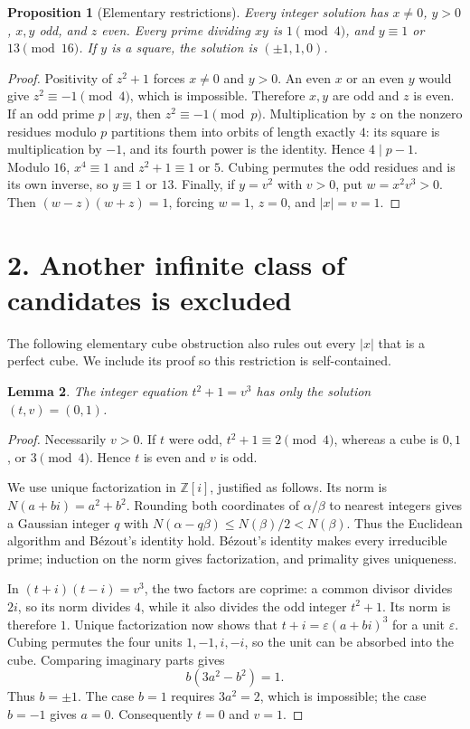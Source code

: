 \documentclass[11pt,a4paper]{article}
\newtheorem{proposition}{Proposition}
\newtheorem{lemma}[proposition]{Lemma}
\begin{document}
\begin{proposition}[Elementary restrictions]
Every integer solution has $x\ne0$, $y>0$, $x,y$ odd, and $z$ even. Every prime
dividing $xy$ is $1\pmod4$, and $y\equiv1$ or $13\pmod{16}$.
If $y$ is a square, the solution is $(\pm1,1,0)$.
\end{proposition}
\begin{proof}
Positivity of $z^2+1$ forces $x\ne0$ and $y>0$. An even $x$ or an even $y$
would give $z^2\equiv-1\pmod4$, which is impossible. Therefore $x,y$ are odd
and $z$ is even. If an odd prime $p\mid xy$, then $z^2\equiv-1\pmod p$.
Multiplication by $z$ on the nonzero residues modulo $p$ partitions them into
orbits of length exactly $4$: its square is multiplication by $-1$, and its
fourth power is the identity. Hence $4\mid p-1$.
Modulo $16$, $x^4\equiv1$ and $z^2+1\equiv1$ or $5$.
Cubing permutes the odd residues and is its own inverse, so $y\equiv1$ or $13$.
Finally, if $y=v^2$ with $v>0$, put $w=x^2v^3>0$. Then
$(w-z)(w+z)=1$, forcing $w=1$, $z=0$, and $|x|=v=1$.
\end{proof}

\newpage
\section*{2. Another infinite class of candidates is excluded}
The following elementary cube obstruction also rules out every $|x|$ that is
a perfect cube. We include its proof so this restriction is self-contained.

\begin{lemma}
The integer equation $t^2+1=v^3$ has only the solution $(t,v)=(0,1)$.
\end{lemma}
\begin{proof}
Necessarily $v>0$. If $t$ were odd, $t^2+1\equiv2\pmod4$, whereas a cube is
$0,1$, or $3\pmod4$. Hence $t$ is even and $v$ is odd.

We use unique factorization in $\mathbb Z[i]$, justified as follows. Its norm
is $N(a+bi)=a^2+b^2$. Rounding both coordinates of $\alpha/\beta$ to nearest
integers gives a Gaussian integer $q$ with
$N(\alpha-q\beta)\le N(\beta)/2<N(\beta)$. Thus the Euclidean algorithm
and B\'ezout's identity hold. B\'ezout's identity makes every irreducible
prime; induction on the norm gives factorization, and primality gives
uniqueness.

In $(t+i)(t-i)=v^3$, the two factors are coprime: a common divisor divides
$2i$, so its norm divides $4$, while it also divides the odd integer $t^2+1$.
Its norm is therefore $1$. Unique factorization now shows that
$t+i=\varepsilon(a+bi)^3$ for a unit $\varepsilon$. Cubing permutes the four
units $1,-1,i,-i$, so the unit can be absorbed into the cube. Comparing
imaginary parts gives
\[
 b(3a^2-b^2)=1.
\]
Thus $b=\pm1$. The case $b=1$ requires $3a^2=2$, which is impossible;
the case $b=-1$ gives $a=0$. Consequently $t=0$ and $v=1$.
\end{proof}
\end{document}
